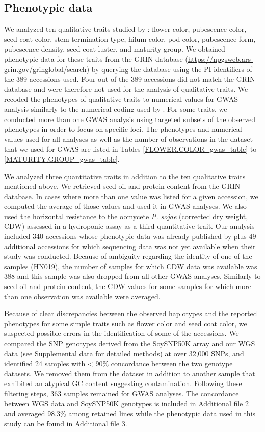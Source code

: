 \subsection*{Phenotypic data}
\label{sv-gwas-phenotypic-data}

We analyzed ten qualitative traits studied by \cite{bandillo2017}: flower
color, pubescence color, seed coat color, stem termination type, hilum color,
pod color, pubescence form, pubescence density, seed coat luster, and maturity
group.  We obtained phenotypic data for these traits from the GRIN database
(\url{https://npgsweb.ars-grin.gov/gringlobal/search}) by querying the database
using the PI identifiers of the 389 accessions used.  Four out of the 389
accessions did not match the GRIN database and were therefore not used for the
analysis of qualitative traits. We recoded the phenotypes of qualitative traits
to numerical values for GWAS analysis similarly to the numerical coding used by
\cite{bandillo2017}.  For some traits, we conducted more than one GWAS analysis
using targeted subsets of the observed phenotypes in order to focus on specific
loci. The phenotypes and numerical values used for all analyses as well as the
number of observations in the dataset that we used for GWAS are listed in
Tables \ref{FLOWER.COLOR_gwas_table} to \ref{MATURITY.GROUP_gwas_table}.

We analyzed three quantitative traits in addition to the ten qualitative traits
mentioned above.  We retrieved seed oil and protein content from the GRIN
database. In cases where more than one value was listed for a given accession,
we computed the average of those values and used it in GWAS analyses. We also
used the horizontal resistance to the oomycete \emph{P. sojae} (corrected dry
weight, CDW) assessed in a hydroponic assay \citep{deronne2022} as a third
quantitative trait. Our analysis included 340 accessions whose phenotypic data
was already published by \cite{deronne2022} plus 49 additional accessions for
which sequencing data was not yet available when their study was conducted.
Because of ambiguity regarding the identity of one of the samples (HN019), the
number of samples for which CDW data was available was 388 and this sample
was also dropped from all other GWAS analyses. Similarly to seed oil and
protein content, the CDW values for some samples for which more than one
observation was available were averaged.

Because of clear discrepancies between the observed haplotypes and the
reported phenotypes for some simple traits such as flower color and seed coat
color, we suspected possible errors in the identification of some of the
accessions. We compared the SNP genotypes derived from the SoySNP50K array
and our WGS data (see Supplemental data
for detailed methods) at over 32,000 SNPs, and
identified 24 samples with < 90\% concordance between the two genotype
datasets. We removed them from the dataset in addition to another
sample that exhibited an atypical GC content suggesting contamination.
Following these filtering steps, 363 samples remained for GWAS analyses. The
concordance between WGS data and SoySNP50K genotypes is included in
Additional file 2 and averaged 98.3\% among retained lines while the
phenotypic data used in this study can be found in Additional file 3.

